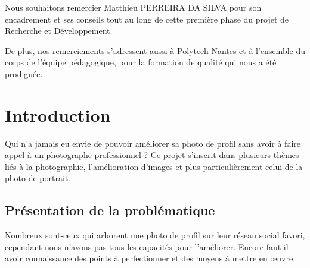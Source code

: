\documentclass[11pt, french]{report-rd-info}
\begin{document}
\begin{classification}
\end{classification}

\maketitle


\begin{acknowledgements}
Nous souhaitons remercier Matthieu PERREIRA DA SILVA pour son encadrement et ses conseils tout au long de cette première phase du projet de Recherche et Développement.

De plus, nos remerciements s'adressent aussi à Polytech Nantes et à l'ensemble du corps de l'équipe pédagogique, pour la formation de qualité qui nous a été prodiguée.

\end{acknowledgements}


\newpage

\tableofcontents


\chapter{Introduction}
Qui n'a jamais eu envie de pouvoir améliorer sa photo de profil sans avoir à faire appel à un photographe professionnel ? Ce projet s'inscrit dans plusieurs thèmes liés à la photographie, l'amélioration d'images et plus particulièrement celui de la photo de portrait.

\section{Présentation de la problématique}
Nombreux sont-ceux qui arborent une photo de profil sur leur réseau social favori, cependant nous n'avons pas tous les capacités pour l'améliorer. Encore faut-il avoir connaissance des points à perfectionner et des moyens à mettre en œuvre. 
\end{document}

